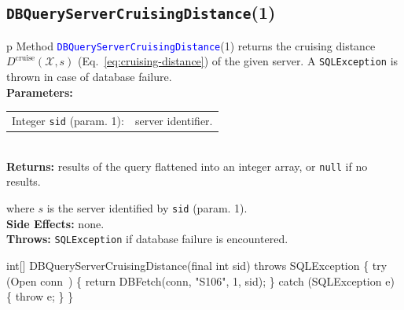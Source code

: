 \subsection{\texttt{DBQueryServerCruisingDistance}(1)}
\begin{tabular}{p{\textwidth}}
\toprule
{}
Method \textcolor{blue}{{\tt{}\protect{}DBQueryServerCruisingDistance}}(1) returns the
cruising distance $D^\textrm{cruise}(\mathcal{X},s)$
(Eq.~\ref{eq:cruising-distance}) of the given server.
A {\tt{}SQLException} is thrown in case of database failure.\\
\midrule
\textbf{Parameters:}\\
\begin{tabular}{lp{116mm}}
Integer {\tt{}sid} (param. 1):&server identifier.
\end{tabular}\\
\textbf{Returns:} results of the query flattened into an integer array,
or {\tt{}null} if no results.


where $s$ is the server identified by {\tt{}sid} (param. 1).\\
\textbf{Side Effects:} none.\\
\textbf{Throws:} {\tt{}SQLException} if database failure is encountered.\\
\bottomrule
\end{tabular}
\nwenddocs{}\endmoddef{}
int[] DBQueryServerCruisingDistance(final int sid) throws SQLException \{
  try (\LA{}Open \code{}conn\edoc{}~{\nwtagstyle{}}\RA{}) \{
    return DBFetch(conn, "S106", 1, sid);
  \} catch (SQLException e) \{
    throw e;
  \}
\}
\eatline
{}\nwendcode{}\nwdocspar
